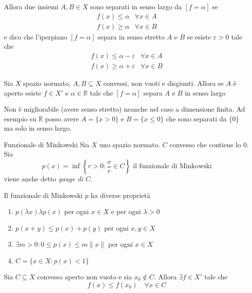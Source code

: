Allora due insiemi \(A, B \in X\) sono separati in senso largo da \([f = \alpha]\) se
\begin{align*}
    f{(x)} \le \alpha & \forall x \in A \\
    f{(x)} \ge \alpha & \forall x \in B
\end{align*}
e dico che l'iperpiano \([f = \alpha]\) separa in senso stretto \(A\) e \(B\) se
esiste \(\varepsilon > 0\) tale che
\begin{align*}
    f{(x)} \le \alpha - \varepsilon & \forall x \in A \\
    f{(x)} \ge \alpha + \varepsilon & \forall x \in B
\end{align*}
\begin{theorem}
    Sia \(X\) spazio normato, \(A, B \subseteq X \) convessi, non vuoti e
    disgiunti. Allora se \(A\) è aperto esiste \(f \in X'\) e \(\alpha \in \mathbb{R}\)  tale che \([f = \alpha]\) separa \(A\) e \(B\) in senso largo
\end{theorem}
\begin{remark}{}
    Non è migliorabile (avere senso stretto) neanche nel caso a dimensione
    finita. Ad esempio su \(\mathbb{R}\) posso avere \(A=\{x >0\} \) e \(B=\{ x \le 0\}\) che sono separati da \( \{0\} \) ma solo in senso largo.
\end{remark}
\begin{definition}{Funzionale di Minkowski}
    Sia \(X\) uno spazio normato. \(C\) convesso che contiene lo 0. Sia
    \[
      p{(x)} = \inf \left\{ r > 0 : \frac{x}{r} \in C\right\}  \text{ il funzionale di
      Minkowski}
    \]
    viene anche detto \emph{gauge di \(C\)}.
\end{definition}
\begin{remark}{} Il funzionale di Minkowski \(p\) ha diverse proprietà
\begin{enumerate}[label = \arabic*.]
    \item \(p {(\lambda x )} \lambda p {(x)}\) per ogni \(x \in X\)  e per ogni
        \(\lambda > 0\) 
    \item \(p{(x + y)} \le p {(x)} + p {(y)}\) per ogni \(x, y \in X\) 
    \item \(\exists  m > 0 : 0 \le p {(x)} \le m \|x\|\) per ogni \(x \in X\) 
    \item \(C = \{ x \in X : p {( x)} <1\} \) 
\end{enumerate}
\end{remark}
\begin{lemma}
    Sia \(C \subseteq X \) convesso aperto non vuoto e sia \(x_{0} \not\in C\).
    Allora \(\exists f \in X'\) tale che 
    \[
      f{(x)} \le f{(x_{0})} \quad \forall x \in C
    \]
\end{lemma}


